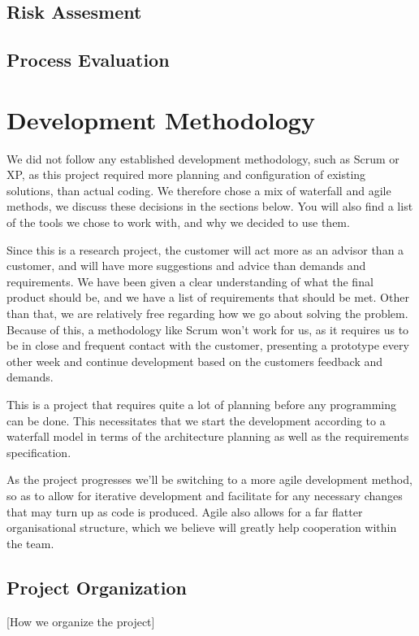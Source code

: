 \documentclass[12pt]{article}
\begin{document}
    \subsection{Risk Assesment}\label{risk}
    
    \subsection{Process Evaluation}\label{processevaluation}
    
\section{Development Methodology}\label{methodology} 
    We did not follow any established development methodology, such as Scrum or XP, as this project required more planning and configuration of existing solutions, than actual coding. We therefore chose a mix of waterfall and agile methods, we discuss these decisions in the sections below. You will also find a list of the tools we chose to work with, and why we decided to use them. 
    
    Since this is a research project, the customer will act more as an advisor than a customer, and will have more suggestions and advice than demands and requirements. We have been given a clear understanding of what the final product should be, and we have a list of requirements that should be met. Other than that, we are relatively free regarding how we go about solving the problem. Because of this, a methodology like Scrum won't work for us, as it requires us to be in close and frequent contact with the customer, presenting a prototype every other week and continue development based on the customers feedback and demands.
    
    This is a project that requires quite a lot of planning before any programming can be done. This necessitates that we start the development according to a waterfall model in terms of the architecture planning as well as the requirements specification.
    
    As the project progresses we’ll be switching to a more agile development method, so as to allow for iterative development and facilitate for any necessary changes that may turn up as code is produced. Agile also allows for a far flatter organisational structure, which we believe will greatly help cooperation within the team.

    \subsection{Project Organization}\label{projectorg}[How we organize the project]
    
\end{document}
